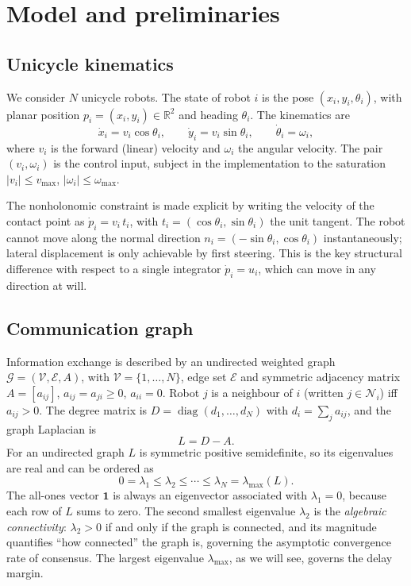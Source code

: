 \documentclass[11pt,a4paper]{article}
\newcommand{\R}{\mathbb{R}}
\newcommand{\Lap}{L}
\newcommand{\lammax}{\lambda_{\max}}
\begin{document}
\section{Model and preliminaries}
\label{sec:model}

\subsection{Unicycle kinematics}

We consider $N$ unicycle robots. The state of robot $i$ is the pose
$(x_i,y_i,\theta_i)$, with planar position $p_i=(x_i,y_i)\in\R^2$ and heading
$\theta_i$. The kinematics are
\begin{equation}
\dot{x}_i = v_i\cos\theta_i, \qquad
\dot{y}_i = v_i\sin\theta_i, \qquad
\dot{\theta}_i = \omega_i,
\label{eq:unicycle}
\end{equation}
where $v_i$ is the forward (linear) velocity and $\omega_i$ the angular velocity. The pair
$(v_i,\omega_i)$ is the control input, subject in the implementation to the saturation
$|v_i|\le v_{\max}$, $|\omega_i|\le\omega_{\max}$.

The nonholonomic constraint is made explicit by writing the velocity of the contact point as
$\dot p_i = v_i\,t_i$, with $t_i=(\cos\theta_i,\sin\theta_i)$ the unit tangent. The robot
cannot move along the normal direction $n_i=(-\sin\theta_i,\cos\theta_i)$ instantaneously;
lateral displacement is only achievable by first steering. This is the key structural
difference with respect to a single integrator $\dot p_i = u_i$, which can move in any
direction at will.

\subsection{Communication graph}

Information exchange is described by an undirected weighted graph
$\mathcal G=(\mathcal V,\mathcal E,A)$, with $\mathcal V=\{1,\dots,N\}$, edge set
$\mathcal E$ and symmetric adjacency matrix $A=[a_{ij}]$, $a_{ij}=a_{ji}\ge0$, $a_{ii}=0$.
Robot $j$ is a neighbour of $i$ (written $j\in\mathcal N_i$) iff $a_{ij}>0$. The degree matrix
is $D=\operatorname{diag}(d_1,\dots,d_N)$ with $d_i=\sum_j a_{ij}$, and the graph Laplacian is
\begin{equation}
\Lap = D - A.
\label{eq:laplacian}
\end{equation}
For an undirected graph $\Lap$ is symmetric positive semidefinite, so its eigenvalues are real
and can be ordered as
\[
0 = \lambda_1 \le \lambda_2 \le \cdots \le \lambda_N = \lammax(\Lap).
\]
The all-ones vector $\mathbf 1$ is always an eigenvector associated with $\lambda_1=0$, because
each row of $\Lap$ sums to zero. The second smallest eigenvalue $\lambda_2$ is the
\emph{algebraic connectivity}: $\lambda_2>0$ if and only if the graph is connected, and its
magnitude quantifies ``how connected'' the graph is, governing the asymptotic convergence
rate of consensus. The largest eigenvalue $\lammax$, as we will see, governs the delay
margin.
\end{document}
